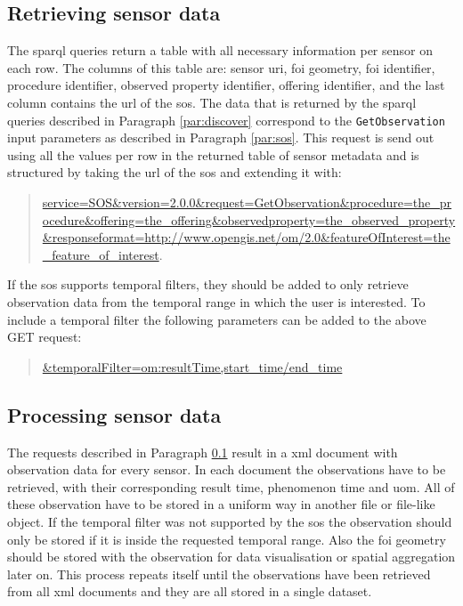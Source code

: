 \subsection{Retrieving sensor data}
\label{par:retrieve}
 The \ac{sparql} queries return a table with all necessary information per sensor on each row. The columns of this table are: sensor \ac{uri}, \ac{foi} geometry, \ac{foi} identifier, procedure identifier, observed property identifier, offering identifier, and the last column contains the \ac{url} of the \ac{sos}. The data that is returned by the \ac{sparql} queries described in Paragraph \ref{par:discover} correspond to the \texttt{GetObservation} input parameters as described in Paragraph \ref{par:sos}. This request is send out using all the values per row in the returned table of sensor metadata and is structured by taking the \ac{url} of the \ac{sos} and extending it with: 
 \begin{quote}
 	\url{service=SOS&version=2.0.0&request=GetObservation&procedure=the_procedure&offering=the_offering&observedproperty=the_observed_property&responseformat=http://www.opengis.net/om/2.0&featureOfInterest=the_feature_of_interest}. 
 \end{quote} 
 
 If the \ac{sos} supports temporal filters, they should be added to only retrieve observation data from the temporal range in which the user is interested. To include a temporal filter the following parameters can be added to the above GET request:
\begin{quote}
	\url{&temporalFilter=om:resultTime,start_time/end_time}
\end{quote} 


\subsection{Processing sensor data}
The requests described in Paragraph \ref{par:retrieve} result in a \ac{xml} document with observation data for every sensor. In each document the observations have to be retrieved, with their corresponding result time, phenomenon time and \ac{uom}. All of these observation have to be stored in a uniform way in another file or file-like object. If the temporal filter was not supported by the \ac{sos} the observation should only be stored if it is inside the requested temporal range. Also the \ac{foi} geometry should be stored with the observation for data visualisation or spatial aggregation later on. This process repeats itself until the observations have been retrieved from all \ac{xml} documents and they are all stored in a single dataset.  

